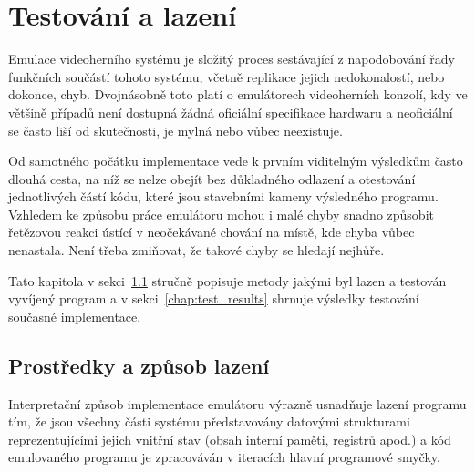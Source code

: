 
\chapter{Testování a lazení}\label{chap:test}

Emulace videoherního systému je složitý proces sestávající z napodobování řady
funkčních součástí tohoto systému, včetně replikace jejich nedokonalostí, nebo
dokonce, chyb. Dvojnásobně toto platí o emulátorech videoherních konzolí, kdy
ve většině případů není dostupná žádná oficiální specifikace hardwaru a
neoficiální se často liší od skutečnosti, je mylná nebo vůbec neexistuje.

Od samotného počátku implementace vede k prvním viditelným výsledkům často
dlouhá cesta, na níž se nelze obejít bez důkladného odlazení a otestování
jednotlivých částí kódu, které jsou stavebními kameny výsledného programu.
Vzhledem ke způsobu práce emulátoru mohou i malé chyby snadno způsobit
řetězovou reakci ústící v neočekávané chování na místě, kde chyba vůbec
nenastala. Není třeba zmiňovat, že takové chyby se hledají nejhůře.

Tato kapitola v sekci~\ref{chap:test_debug} stručně popisuje metody jakými byl
lazen a testován vyvíjený program a v sekci~\ref{chap:test_results} shrnuje
výsledky testování současné implementace.


\section{Prostředky a způsob lazení}\label{chap:test_debug}

Interpretační způsob implementace emulátoru výrazně usnadňuje lazení programu
tím, že jsou všechny části systému představovány datovými strukturami
reprezentujícími jejich vnitřní stav (obsah interní paměti, registrů apod.) a
kód emulovaného programu je zpracováván v iteracích hlavní programové smyčky.


